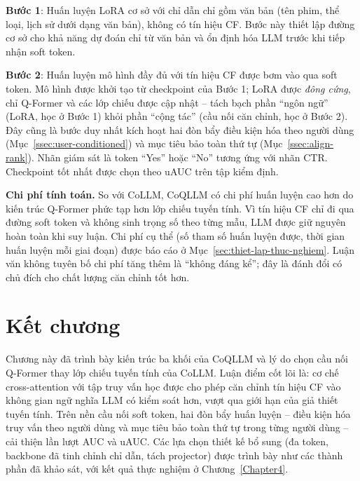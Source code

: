 \textbf{Bước 1}: Huấn luyện LoRA cơ sở với chỉ dẫn chỉ gồm văn bản (tên phim, thể loại,
lịch sử dưới dạng văn bản), không có tín hiệu CF. Bước này thiết lập đường cơ sở cho
khả năng dự đoán chỉ từ văn bản và ổn định hóa LLM trước khi tiếp nhận soft token.

\textbf{Bước 2}: Huấn luyện mô hình đầy đủ với tín hiệu CF được bơm vào qua soft token.
Mô hình được khởi tạo từ checkpoint của Bước 1; LoRA được \textit{đông cứng}, chỉ Q-Former
và các lớp chiếu được cập nhật -- tách bạch phần ``ngôn ngữ'' (LoRA, học ở Bước 1) khỏi
phần ``cộng tác'' (cầu nối căn chỉnh, học ở Bước 2). Đây cũng là bước duy nhất kích hoạt
hai đòn bẩy điều kiện hóa theo người dùng (Mục~\ref{ssec:user-conditioned}) và mục tiêu
bảo toàn thứ tự (Mục~\ref{ssec:align-rank}). Nhãn giám sát là token ``Yes'' hoặc ``No''
tương ứng với nhãn CTR. Checkpoint tốt nhất được chọn theo uAUC trên tập kiểm định.

\textbf{Chi phí tính toán.} So với CoLLM, CoQLLM có chi phí huấn luyện cao hơn do kiến
trúc Q-Former phức tạp hơn lớp chiếu tuyến tính. Vì tín hiệu CF chỉ đi qua đường soft
token và không sinh trọng số theo từng mẫu, LLM được giữ nguyên hoàn toàn khi suy luận.
Chi phí cụ thể (số tham số huấn luyện được, thời gian huấn luyện mỗi giai đoạn) được báo
cáo ở Mục~\ref{sec:thiet-lap-thuc-nghiem}. Luận văn không tuyên bố chi phí tăng thêm là
``không đáng kể''; đây là đánh đổi có chủ đích cho chất lượng căn chỉnh tốt hơn.

\section{Kết chương}
\label{sec:ket-chuong-3}

Chương này đã trình bày kiến trúc ba khối của CoQLLM và lý do chọn cầu nối Q-Former thay
lớp chiếu tuyến tính của CoLLM. Luận điểm cốt lõi là: cơ chế cross-attention với tập
truy vấn học được cho phép căn chỉnh tín hiệu CF vào không gian ngữ nghĩa LLM có kiểm
soát hơn, vượt qua giới hạn của giả thiết tuyến tính. Trên nền cầu nối soft token, hai
đòn bẩy huấn luyện -- điều kiện hóa truy vấn theo người dùng và mục tiêu bảo toàn thứ tự
trong từng người dùng -- cải thiện lần lượt AUC và uAUC. Các lựa chọn thiết kế bổ sung (đa token,
backbone đã tinh chỉnh chỉ dẫn, tách projector) được trình bày như các thành phần đã khảo
sát, với kết quả thực nghiệm ở Chương~\ref{Chapter4}.
